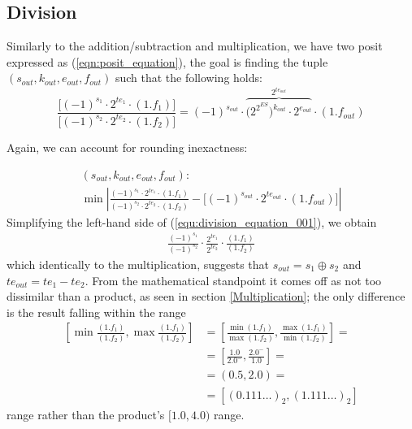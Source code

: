 \subsection{Division}



Similarly to the addition/subtraction and multiplication, we have two posit expressed as (\eqref{eqn:posit_equation}), the goal is finding the tuple $(s_{out}, k_{out}, e_{out}, f_{out})$ such that
the following holds:
\begin{equation}\label{equ:division_equation_001}
    \frac{\big[ (-1)^{s_1} \cdot 2^{te_1} \cdot (1.f_1) \big]}{\big[ (-1)^{s_2} \cdot 2^{te_2} \cdot (1.f_2) \big]} = (-1)^{s_{out}} \cdot \overbrace{\big(2^{2^{ES}}\big)^{k_{out}} \cdot 2^{e_{out}}}^{2^{te_{out}}} \cdot (1.f_{out})
\end{equation}

Again, we can account for rounding inexactness:


\begin{equation}
\begin{gathered}
    (s_{out}, k_{out}, e_{out}, f_{out}): \\
    \min \left| \frac{ (-1)^{s_1} \cdot 2^{te_1} \cdot (1.f_1)}{(-1)^{s_2} \cdot 2^{te_2} \cdot (1.f_2)} - \big[ (-1)^{s_{out}} \cdot 2^{te_{out}} \cdot (1.f_{out}) \big] \right|
\end{gathered}
\end{equation}
Simplifying the left-hand side of (\ref{equ:division_equation_001}), we obtain
\begin{equation}
\begin{gathered}
    \frac{(-1)^{s_1}}{(-1)^{s_2}} \cdot \frac{2^{te_1}}{2^{te_2}} \cdot \frac{(1.f_1)}{(1.f_2)}
\end{gathered}
\end{equation}
which identically to the multiplication, suggests that $s_{out} = s_1 \oplus s_2$ and $te_{out} = te_1 - te_2$.
From the mathematical standpoint it comes off as not too dissimilar than a product, as seen in section \ref{Multiplication}; the only difference is the result falling within the range
\begin{equation}\label{equ:min_max_frac_0010032}
\begin{aligned}
\left[\min{\frac{(1.f_1)}{(1.f_2)}}, \max{\frac{(1.f_1)}{(1.f_2)}} \right] &= \left[\frac{\min{(1.f_1)}}{\max{(1.f_2)}}, \frac{\max{(1.f_1)}}{\min{(1.f_2)}} \right] = \\
&= \left[\frac{1.0}{2.0^{-}}, \frac{2.0^{-}}{1.0} \right] =\\
&= \left(0.5, 2.0 \right) = \\
&= \left[(0.111\dots)_2, (1.111\dots)_2 \right]
\end{aligned}
\end{equation}
range rather than the product's $[1.0, 4.0)$ range.


